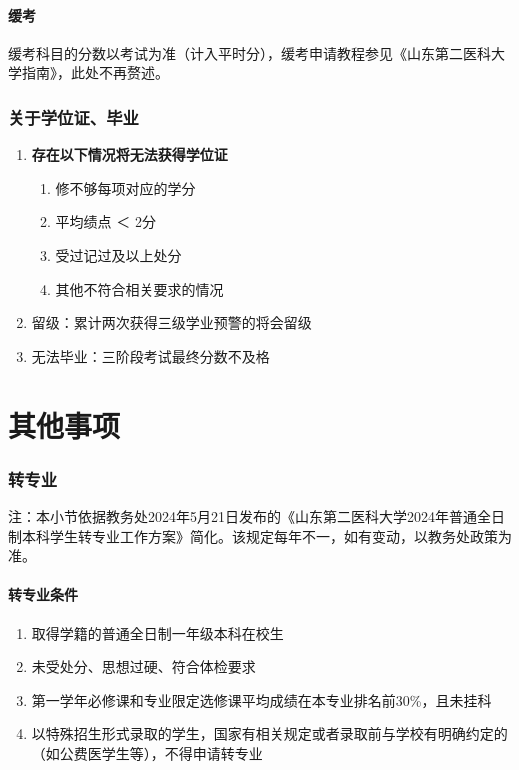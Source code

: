 \subsection[缓考]{缓考}
缓考科目的分数以考试为准（计入平时分），缓考申请教程参见《山东第二医科大学指南》，此处不再赘述。

\section[关于学位证、毕业]{关于学位证、毕业}
\begin{enumerate}
    \item \textbf{存在以下情况将无法获得学位证}
          \begin{enumerate}
              \item 修不够每项对应的学分
              \item 平均绩点 ＜ 2分
              \item 受过记过及以上处分
              \item 其他不符合相关要求的情况
          \end{enumerate}
    \item 留级：累计两次获得三级学业预警的将会留级
    \item 无法毕业：三阶段考试最终分数不及格
\end{enumerate}

\part[其他事项]{其他事项}

\section[转专业]{转专业}

注：本小节依据教务处2024年5月21日发布的《山东第二医科大学2024年普通全日制本科学生转专业工作方案》简化。该规定每年不一，如有变动，以教务处政策为准。

\subsection[转专业条件]{转专业条件}
\begin{enumerate}
    \item 取得学籍的普通全日制一年级本科在校生
    \item 未受处分、思想过硬、符合体检要求
    \item 第一学年必修课和专业限定选修课平均成绩在本专业排名前30\%，且未挂科
    \item 以特殊招生形式录取的学生，国家有相关规定或者录取前与学校有明确约定的（如公费医学生等），不得申请转专业
\end{enumerate}

